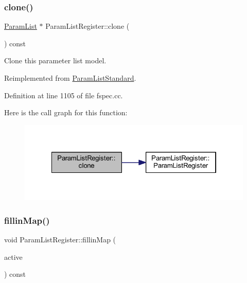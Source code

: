 \subsubsection{\texorpdfstring{clone()}{clone()}}
{\footnotesize\ttfamily \mbox{\hyperlink{class_param_list}{Param\+List}} $\ast$ Param\+List\+Register\+::clone (\begin{DoxyParamCaption}\item[{void}]{ }\end{DoxyParamCaption}) const\hspace{0.3cm}{\ttfamily [virtual]}}



Clone this parameter list model. 



Reimplemented from \mbox{\hyperlink{class_param_list_standard_a8257219823fdb31ac4aa59d2c0c640e5}{Param\+List\+Standard}}.



Definition at line 1105 of file fspec.\+cc.

Here is the call graph for this function\+:
\nopagebreak
\begin{figure}[H]
\begin{center}
\leavevmode
\includegraphics[width=322pt]{class_param_list_register_a1c4f79c909f11b3859f93f293acb9a1d_cgraph}
\end{center}
\end{figure}
\mbox{\label{class_param_list_register_a35bf1a7b1033500cb3657608c27d4786}} 
\subsubsection{\texorpdfstring{fillinMap()}{fillinMap()}}
{\footnotesize\ttfamily void Param\+List\+Register\+::fillin\+Map (\begin{DoxyParamCaption}\item[{\mbox{\hyperlink{class_param_active}{Param\+Active}} $\ast$}]{active }\end{DoxyParamCaption}) const\hspace{0.3cm}{\ttfamily [virtual]}}



